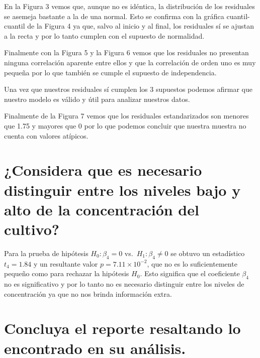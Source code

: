 \documentclass[10pt, spanish]{article}
\begin{document}
    
    En la Figura 3 vemos que, aunque no es idéntica, la distribución de los
residuales se asemeja bastante a la de una normal. Esto se confirma con
la gráfica cuantil-cuantil de la Figura 4 ya que, salvo al inicio y al
final, los residuales sí se ajustan a la recta y por lo tanto cumplen
con el supuesto de normalidad.

    \begin{center}
    \end{center}
    
    
    Finalmente con la Figura 5 y la Figura 6 vemos que los residuales no
presentan ninguna correlación aparente entre ellos y que la correlación
de orden uno es muy pequeña por lo que también se cumple el supuesto de
independencia.

Una vez que nuestros residuales sí cumplen los 3 supuestos podemos
afirmar que nuestro modelo es válido y útil para analizar nuestros
datos.

    \begin{center}
    \end{center}
    
    
    Finalmente de la Figura 7 vemos que los residuales estandarizados son
menores que 1.75 y mayores que 0 por lo que podemos concluir que nuestra
muestra no cuenta con valores atípicos.

    \hypertarget{considera-que-es-necesario-distinguir-entre-los-niveles-bajo-y-alto-de-la-concentraciuxf3n-del-cultivo}{%
\section{¿Considera que es necesario distinguir entre los niveles bajo y
alto de la concentración del
cultivo?}\label{considera-que-es-necesario-distinguir-entre-los-niveles-bajo-y-alto-de-la-concentraciuxf3n-del-cultivo}}

    Para la prueba de hipótesis \(H_0: \beta_4 = 0\)
vs.~\(H_1: \beta_4 \neq 0\) se obtuvo un estadístico \(t_4 = 1.84\) y un
resultante valor \(p = 7.11 × 10^{-2}\), que no es lo suficientemente
pequeño como para rechazar la hipótesis \(H_0\). Esto significa que el
coeficiente \(\beta_4\) no es significativo y por lo tanto no es
necesario distinguir entre los niveles de concentración ya que no nos
brinda información extra.

    \hypertarget{concluya-el-reporte-resaltando-lo-encontrado-en-su-anuxe1lisis.}{%
\section{Concluya el reporte resaltando lo encontrado en su
análisis.}\label{concluya-el-reporte-resaltando-lo-encontrado-en-su-anuxe1lisis.}}
\end{document}
